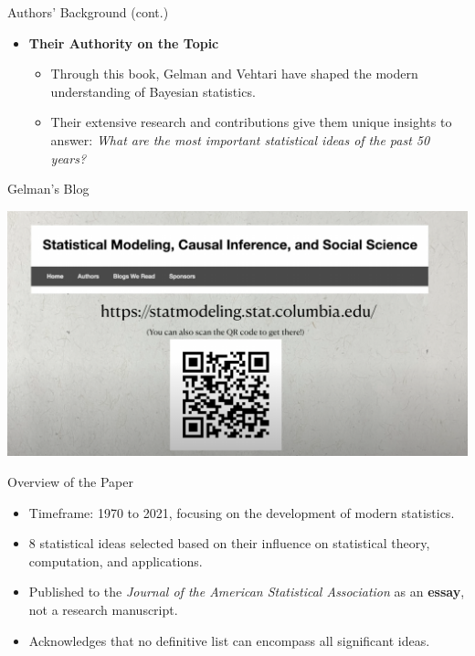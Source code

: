 \documentclass{beamer}
\begin{document}
\begin{frame}{Authors' Background (cont.)}
\begin{minipage}{0.6\textwidth}
\begin{itemize}
\begin{itemize}
        \end{itemize}
        \vspace{0.5em} 
        \item \textbf{Their Authority on the Topic}
        \begin{itemize}
            \item Through this book, Gelman and Vehtari have shaped the modern understanding of Bayesian statistics.
            \item Their extensive research and contributions give them unique insights to answer: \textit{What are the most important statistical ideas of the past 50 years?}
        \end{itemize}
    \end{itemize}
\end{minipage}
\end{frame}



\begin{frame}{Gelman's Blog}
\begin{center}
    \includegraphics[width=\textwidth]{statistical_modeling_blog.png}
\end{center}
\end{frame}


\begin{frame}{Overview of the Paper}
\begin{itemize}
    \item Timeframe: 1970 to 2021, focusing on the development of modern statistics.
    \item 8 statistical ideas selected based on their influence on statistical theory, computation, and applications.
    \item Published to the \textit{Journal of the American Statistical Association} as an \textbf{essay}, not a research manuscript.
            \item Acknowledges that no definitive list can encompass all significant ideas.
\end{itemize}
\end{frame}
\end{document}
